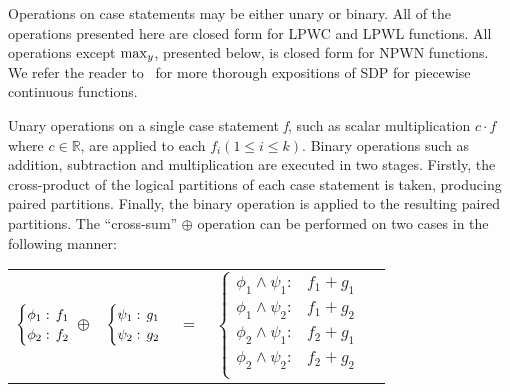 Operations on case statements may be either unary or binary. All of the operations presented here are closed form for LPWC and LPWL functions. All operations except $\contmax_{y}$, presented below, is closed form for NPWN functions. We refer the reader to~\cite{Sanner_UAI_2011,Zamani_AAAI_2012} for more thorough expositions of SDP for piecewise continuous functions.

Unary operations on a single case statement \emph{f}, such as scalar multiplication {\footnotesize$c \cdot f$} where {\footnotesize$ c \in \mathbb{R} $}, are applied to  each {\footnotesize$f_i \left(1 \leq i \leq k\right)$}. Binary operations such as addition, subtraction and multiplication are executed in two stages. Firstly, the cross-product of the logical partitions of each case statement is taken, producing paired partitions. Finally, the binary operation is applied to the resulting paired partitions. The ``cross-sum'' {\footnotesize$\oplus$} operation can be performed on two cases in the following manner:
{\footnotesize 
    \begin{center}
        \begin{tabular}{r c c c l}
            $\begin{cases}
            \phi_1: \hspace{-1mm} & \hspace{-1mm} f_1  \\ 
            \phi_2: \hspace{-1mm} & \hspace{-1mm} f_2  \\ 
            \end{cases}$
            $\oplus$
            &
            \hspace{-4mm}
            $\begin{cases}
            \psi_1: \hspace{-1mm} & \hspace{-1mm} g_1  \\ 
            \psi_2: \hspace{-1mm} & \hspace{-1mm} g_2  \\ 
            \end{cases}$
            &
            \hspace{-4mm} 
            $ = $
            &
            \hspace{-4mm}
            $\begin{cases}
            \phi_1 \wedge \psi_1: & f_1 + g_1 \\
            \phi_1 \wedge \psi_2: & f_1 + g_2 \\
            \phi_2 \wedge \psi_1: & f_2 + g_1 \\
            \phi_2 \wedge \psi_2: & f_2 + g_2  \\
            \end{cases}$
        \end{tabular}
    \end{center}
}%


